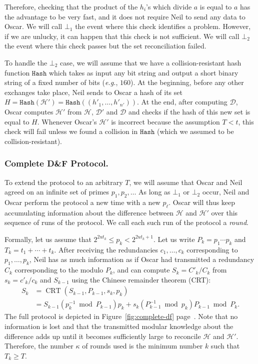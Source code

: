 \documentclass[twoside,envcountsame,runningheads]{llncs}
\newcommand{\Set}{\mathcal{H}}
\newcommand{\SetD}{\mathcal{D}}
\newcommand{\df}{D\&F\xspace}
\newcommand{\eg}{\textit{e.g.}\xspace}
\newcommand{\Hash}{\ensuremath{\mathtt{Hash}}}
\DeclareMathOperator{\CRT}{CRT}
\begin{document}
Therefore, checking that the product of the $h_i$'s which divide $a$ is equal to $a$ has the advantage to be very fast, and it does not require Neil to send any data to Oscar. We will call $\bot_1$ the event where this check identifies a problem. 
However, if we are unlucky, it can happen that this check is not sufficient. We will call $\bot_2$ the event where this check passes but the set reconciliation failed.

To handle the $\bot_2$ case, we will assume that we have a collision-resistant hash function $\Hash$ which takes as input any bit string and output a short binary string of a fixed number of bits (\eg, $160$).
At the beginning, before any other exchanges take place, Neil sends to Oscar a hash of its set $H = \Hash(\Set') = \Hash((h'_1,\dots,h'_{n'}))$. At the end, after computing $\SetD$, Oscar computes $\Set'$ from $\Set$, $\SetD'$ and $\SetD$ and checks if the hash of this new set is equal to $H$.
Whenever Oscar's $\Set'$ is incorrect because the assumption $T < t$, this check will fail unless we found a collision in $\Hash$ (which we assumed to be collision-resistant).

\subsubsection{Complete \df Protocol.}
\label{sec:complete-df}

To extend the protocol to an arbitrary $T$, we will assume that Oscar and Neil agreed on an infinite set of primes $p_1,p_2,\ldots$ As long as $\bot_1$ or $\bot_2$ occur, Neil and Oscar perform the protocol a new time with a new $p_\ell$. Oscar will thus keep accumulating information about the difference between $\Set$ and $\Set'$ over this sequence of runs of the protocol. We call each such run of the protocol a \emph{round}.

Formally, let us assume that $2^{2 u t_k} \le p_k < 2^{2 u t_k +1}$.
Let us write $P_k = p_1 \cdots p_k$ and $T_k = t_1 + \cdots + t_k$.
After receiving the redundancies $c_1,\dots,c_k$ corresponding to $p_1,\dots,p_k$, Neil has as much information as if Oscar had transmitted a redundancy $C_k$ corresponding to the modulo $P_k$, and can compute $S_k = C'_k / C_k$ from $s_k = c'_k/c_k$ and $S_{k-1}$ using the Chinese remainder theorem (CRT): 
\begin{align*}
 S_k &= \CRT(S_{k-1},P_{k-1},s_k,p_k) \\
     &= S_{k-1} (p_k^{-1} \bmod P_{k-1}) p_k + s_k (P_{k-1}^{-1} \bmod p_k) P_{k-1} \bmod P_k.
\end{align*}
The full protocol is depicted in Figure~\ref{fig:complete-df} page~\pageref{fig:complete-df}.
Note that no information is lost and that the transmitted modular knowledge about the difference adds up until it becomes sufficiently large to reconcile $\Set$ and $\Set'$.
Therefore, the number $\kappa$ of rounds used is the minimum number $k$ such that $T_k \ge T$.
\end{document}
